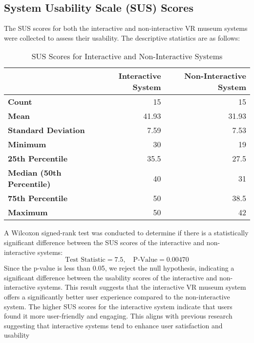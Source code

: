 \documentclass[conference]{IEEEtran}
\begin{document}
\subsection{System Usability Scale (SUS) Scores}
The SUS scores for both the interactive and non-interactive VR museum systems were collected to assess their usability. The descriptive statistics are as follows:
\begin{table}[h]
    \centering
    \begin{tabular}{|l|r|r|}
    \hline
                             & \textbf{Interactive System} & \textbf{Non-Interactive System} \\ \hline
    \textbf{Count}           & 15                          & 15                              \\ \hline
    \textbf{Mean}            & 41.93                       & 31.93                           \\ \hline
    \textbf{Standard Deviation} & 7.59                       & 7.53                            \\ \hline
    \textbf{Minimum}         & 30                          & 19                              \\ \hline
    \textbf{25th Percentile} & 35.5                        & 27.5                            \\ \hline
    \textbf{Median (50th Percentile)} & 40                 & 31                              \\ \hline
    \textbf{75th Percentile} & 50                          & 38.5                            \\ \hline
    \textbf{Maximum}         & 50                          & 42                              \\ \hline
    \end{tabular}
    \caption{SUS Scores for Interactive and Non-Interactive Systems}
\end{table}

A Wilcoxon signed-rank test was conducted to determine if there is a statistically significant difference between the SUS scores of the interactive and non-interactive systems:
\[
\text{Test Statistic} = 7.5, \quad \text{P-Value} = 0.00470
\]
Since the p-value is less than 0.05, we reject the null hypothesis, indicating a significant
difference between the usability scores of the interactive and non-interactive systems. This result suggests that the interactive VR museum system offers a significantly better user experience compared to the non-interactive system. The higher SUS scores for the interactive system indicate that users found it more user-friendly and engaging. This aligns with previous research suggesting that interactive systems tend to enhance user satisfaction and usability
\end{document}

